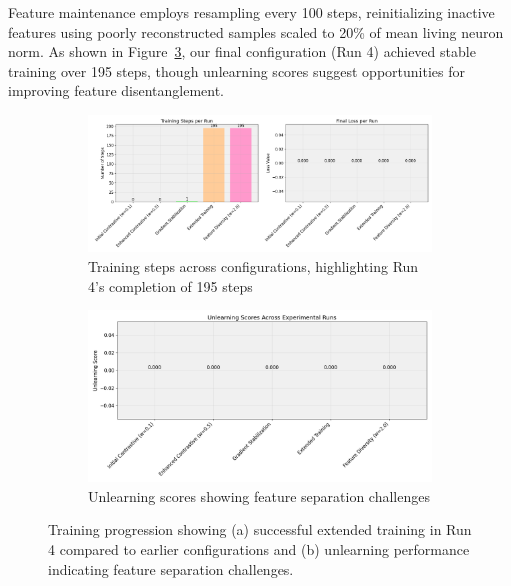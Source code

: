\documentclass{article} %
\begin{document}
Feature maintenance employs resampling every 100 steps, reinitializing inactive features using poorly reconstructed samples scaled to 20\% of mean living neuron norm. As shown in Figure~\ref{fig:training_metrics}, our final configuration (Run 4) achieved stable training over 195 steps, though unlearning scores suggest opportunities for improving feature disentanglement.

\begin{figure}[h]
    \centering
    \begin{subfigure}{0.49\textwidth}
        \includegraphics[width=\textwidth]{training_metrics.png}
        \caption{Training steps across configurations, highlighting Run 4's completion of 195 steps}
        \label{fig:steps_completed}
    \end{subfigure}
    \hfill
    \begin{subfigure}{0.49\textwidth}
        \includegraphics[width=\textwidth]{unlearning_scores.png}
        \caption{Unlearning scores showing feature separation challenges}
        \label{fig:loss_curves}
    \end{subfigure}
    \caption{Training progression showing (a) successful extended training in Run 4 compared to earlier configurations and (b) unlearning performance indicating feature separation challenges.}
    \label{fig:training_metrics}
\end{figure}
\end{document}
